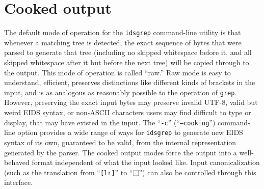 \documentclass[twocolumn]{report}
\begin{document}

\section{Cooked output}

The default mode of operation for the \texttt{idsgrep} command-line utility
is that whenever a matching tree is detected, the exact sequence of bytes
that were parsed to generate that tree (including no skipped whitespace
before it, and all skipped whitespace after it but before the next tree)
will be copied through to the output.  This mode of operation is called
``raw.'' Raw mode is easy to understand, efficient, preserves distinctions
like different kinds of brackets in the input, and is as analogous as
reasonably possible to the operation of \texttt{grep}.  However, preserving
the exact input bytes may preserve invalid UTF-8, valid but weird EIDS
syntax, or non-ASCII characters users may find difficult to type or
display, that may have existed in the input.  The ``\texttt{-c}''
(``\texttt{--cooking}'') command-line option provides a wide range of
ways for \texttt{idsgrep} to generate new EIDS syntax of its own, guaranteed
to be valid, from the internal representation generated by the parser.  The
cooked output modes force the output into a well-behaved format
independent of what the input looked like.
Input canonicalization (such as the translation from ``\texttt{[lr]}'' to
``\texttt{⿰}'') can also be controlled through this interface.
\end{document}
